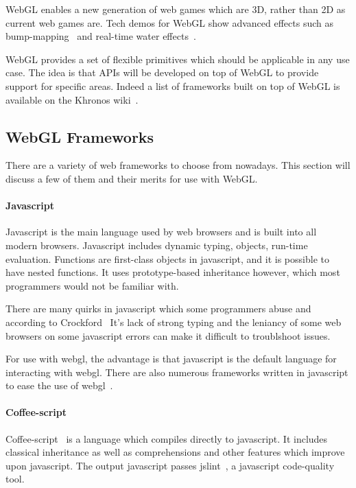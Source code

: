 WebGL enables a new generation of web games which are 3D, rather than 2D as current web games are.
Tech demos for WebGL show advanced effects such as bump-mapping~\cite{web:webglbumpmapping} and real-time water effects~\cite{web:webglwater}.

WebGL provides a set of flexible primitives which should be applicable in any use case.
The idea is that APIs will be developed on top of WebGL to provide support for specific areas.
Indeed a list of frameworks built on top of WebGL is available on the Khronos wiki~\cite{web:webglframeworks}.

\subsection{WebGL Frameworks}
There are a variety of web frameworks to choose from nowadays.
This section will discuss a few of them and their merits for use with WebGL.

\paragraph{Javascript}
Javascript is the main language used by web browsers and is built into all modern browsers.
Javascript includes dynamic typing, objects, run-time evaluation.
Functions are first-class objects in javascript, and it is possible to have nested functions.
It uses prototype-based inheritance however, which most programmers would not be familiar with.

There are many quirks in javascript which some programmers abuse and according to Crockford~\cite{web:javascriptbadparts}
It's lack of strong typing and the leniancy of some web browsers on some javascript errors can make it difficult to troublshoot issues.

For use with webgl, the advantage is that javascript is the default language for interacting with webgl.
There are also numerous frameworks written in javascript to ease the use of webgl~\cite{web:threejs}\cite{web:copperlicht}. 

\paragraph{Coffee-script}
Coffee-script~\cite{web:coffeescript} is a language which compiles directly to javascript.
It includes classical inheritance as well as comprehensions and other features which improve upon javascript.
The output javascript passes jslint~\cite{web:jslint}, a javascript code-quality tool.

